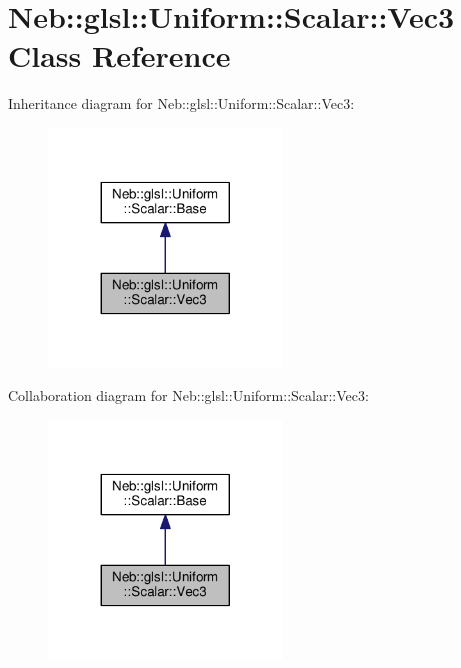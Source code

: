 \hypertarget{classNeb_1_1glsl_1_1Uniform_1_1Scalar_1_1Vec3}{\section{Neb\-:\-:glsl\-:\-:Uniform\-:\-:Scalar\-:\-:Vec3 Class Reference}
\label{classNeb_1_1glsl_1_1Uniform_1_1Scalar_1_1Vec3}
}


Inheritance diagram for Neb\-:\-:glsl\-:\-:Uniform\-:\-:Scalar\-:\-:Vec3\-:
\nopagebreak
\begin{figure}[H]
\begin{center}
\leavevmode
\includegraphics[width=176pt]{classNeb_1_1glsl_1_1Uniform_1_1Scalar_1_1Vec3__inherit__graph}
\end{center}
\end{figure}


Collaboration diagram for Neb\-:\-:glsl\-:\-:Uniform\-:\-:Scalar\-:\-:Vec3\-:
\nopagebreak
\begin{figure}[H]
\begin{center}
\leavevmode
\includegraphics[width=176pt]{classNeb_1_1glsl_1_1Uniform_1_1Scalar_1_1Vec3__coll__graph}
\end{center}
\end{figure}
